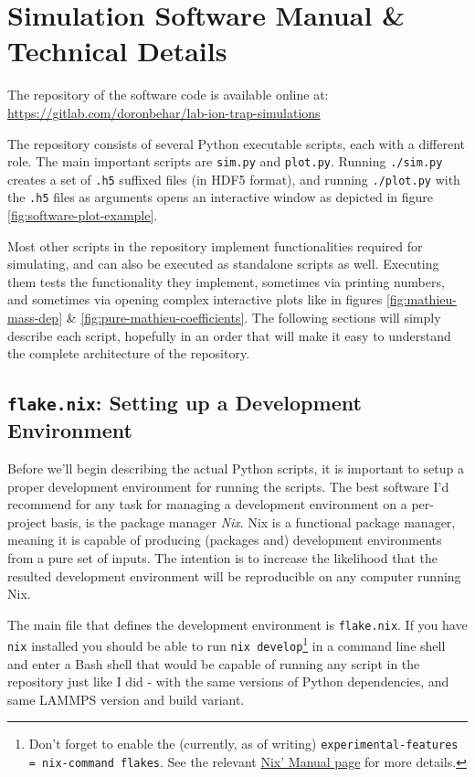\chapter{Simulation Software Manual \& Technical Details}

The repository of the software code is available online at: \url{https://gitlab.com/doronbehar/lab-ion-trap-simulations}

The repository consists of several Python executable scripts, each with a different role. The main important scripts are \texttt{sim.py} and \texttt{plot.py}. Running \texttt{./sim.py} creates a set of \texttt{.h5} suffixed files (in HDF5\cite{HDF5} format), and running \texttt{./plot.py} with the \texttt{.h5} files as arguments opens an interactive window as depicted in figure \ref{fig:software-plot-example}.

Most other scripts in the repository implement functionalities required for simulating, and can also be executed as standalone scripts as well. Executing them tests the functionality they implement, sometimes via printing numbers, and sometimes via opening complex interactive plots like in figures \ref{fig:mathieu-mass-dep} \& \ref{fig:pure-mathieu-coefficients}. The following sections will simply describe each script, hopefully in an order that will make it easy to understand the complete architecture of the repository.

\section{\texttt{flake.nix}: Setting up a Development Environment}

Before we'll begin describing the actual Python scripts, it is important to setup a proper development environment for running the scripts. The best software I'd recommend for any task for managing a development environment on a per-project basis, is the package manager \textit{Nix}\cite{Nix}. Nix is a functional package manager\cite{NixThesis}, meaning it is capable of producing (packages and) development environments from a pure set of inputs. The intention is to increase the likelihood that the resulted development environment will be reproducible\cite{SoftwareReproducitilityThesis} on any computer running Nix.

The main file that defines the development environment is \texttt{flake.nix}. If you have \texttt{nix} installed you should be able to run \texttt{nix develop}\footnote{Don't forget to enable the (currently, as of writing) \texttt{experimental-features = nix-command flakes}. See the relevant \href{https://nix.dev/manual/nix/stable/contributing/experimental-features}{Nix' Manual page} for more details.} in a command line shell and enter a Bash shell that would be capable of running any script in the repository just like I did - with the same versions of Python dependencies, and same LAMMPS version and build variant.

